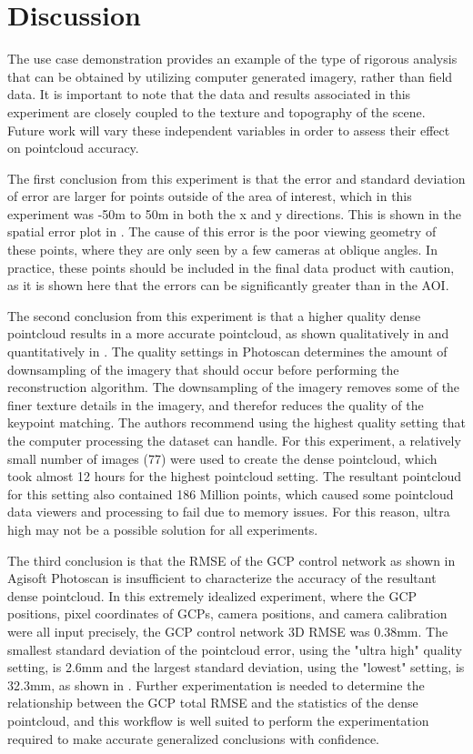 \section{Discussion}

The use case demonstration provides an example of the type of rigorous analysis that can be obtained by utilizing computer generated imagery, rather than field data.  It is important to note that the data and results associated in this experiment are closely coupled to the texture and topography of the scene.  Future work will vary these independent variables in order to assess their effect on pointcloud accuracy.

The first conclusion from this experiment is that the error and standard deviation of error are larger for points outside of the area of interest, which in this experiment was -50m to 50m in both the x and y directions.  This is shown in the spatial error plot in .  The cause of this error is the poor viewing geometry of these points, where they are only seen by a few cameras at oblique angles.  In practice, these points should be included in the final data product with caution, as it is shown here that the errors can be significantly greater than in the AOI.  

The second conclusion from this experiment is that a higher quality dense pointcloud results in a more accurate pointcloud, as shown qualitatively in  and quantitatively in .  The quality settings in Photoscan determines the amount of downsampling of the imagery that should occur before performing the reconstruction algorithm.  The downsampling of the imagery removes some of the finer texture details in the imagery, and therefor reduces the quality of the keypoint matching.  The authors recommend using the highest quality setting that the computer processing the dataset can handle.  For this experiment, a relatively small number of images (77) were used to create the dense pointcloud, which took almost 12 hours for the highest pointcloud setting.  The resultant pointcloud for this setting also contained 186 Million points, which caused some pointcloud data viewers and processing to fail due to memory issues.  For this reason, ultra high may not be a possible solution for all experiments.  

The third conclusion is that the RMSE of the GCP control network as shown in Agisoft Photoscan is insufficient to characterize the accuracy of the resultant dense pointcloud.  In this extremely idealized experiment, where the GCP positions, pixel coordinates of GCPs, camera positions, and camera calibration were all input precisely, the GCP control network 3D RMSE was 0.38mm.  The smallest standard deviation of the pointcloud error, using the "ultra high" quality setting, is 2.6mm and the largest standard deviation, using the "lowest" setting, is  32.3mm, as shown in .  Further experimentation is needed to determine the relationship between the GCP total RMSE and the statistics of the dense pointcloud, and this workflow is well suited to perform the experimentation required to make accurate generalized conclusions with confidence.  


